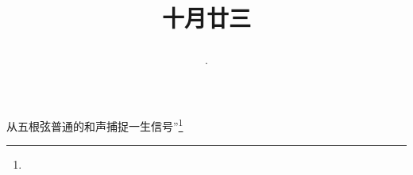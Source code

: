 \title{\date[d=23,m=11,y=2024][year:cn-y,年,month:cn,day:cn,日,·,weekday]·十月廿三 }
从五根弦普通的和声捕捉一生信号”\footnote{ }

